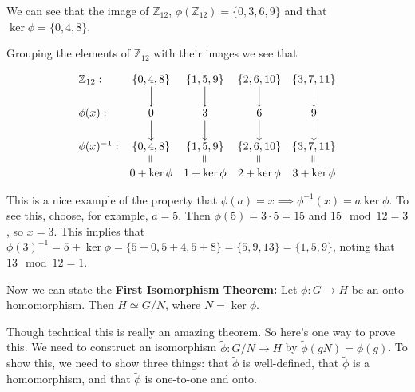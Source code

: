 \documentclass[11pt, oneside]{article}   	%
\theoremstyle{definition}
\newcommand{\veq}{\mathrel{\rotatebox{90}{$=$}}}
\DeclareMathOperator{\bda}{\Big \downarrow}
\begin{document}
\bigskip
\noindent
We can see that the image of $\mathbb{Z}_{12}$, $\phi(\mathbb{Z}_{12}) = \{0,3,6,9\}$ and that $\ker \phi = \{0,4,8\}$. 

\bigskip
\noindent
Grouping the  elements of $\mathbb{Z}_{12}$ with their images we see that

\bigskip
\begin{equation*}
\begin{array}{l c c c c}
\mathbb{Z}_{12}:  & \{0,4,8\}  & \{1,5,9\}     & \{2,6,10\}   & \{3,7,11\} \\
                             & \bda       & \bda          & \bda           & \bda  \\
\phi(x):                  & 0            & 3               & 6                & 9     \\
                             & \bda       & \bda          & \bda           & \bda  \\
\phi(x)^{-1}:          & \{0,4,8\}  & \{1,5,9\}     & \{2,6,10\}    & \{3,7,11\}  \\
                             & \veq       & \veq           & \veq           & \veq \\
                             & 0 + \ker \phi & 1+\ker \phi & 2+\ker \phi & 3+\ker \phi

\end{array}
\end{equation*}

\bigskip
\noindent
This is a nice example of the property  that $\phi(a) = x \implies \phi^{-1}(x) = a \ker \phi$. To see this, choose, for example, $a = 5$. Then 
$\phi(5) = 3\cdot 5 = 15$ and $15 \mod 12 = 3$, so $x = 3$. This implies that  
$\phi(3)^{-1} = 5 + \ker \phi = \{5+0, 5+4, 5+8\} = \{5, 9, 13\} = \{1,5,9\}$, noting that $13 \mod 12 = 1$. 

\bigskip
\noindent
Now we can state the \textbf{First Isomorphism Theorem:} Let $\phi: G \rightarrow H$ be an onto homomorphism.  Then $H \simeq G/N$, where $N = \ker \phi$.

\bigskip
\noindent
Though technical this is really an amazing theorem. So here's one way to prove this.  We need to construct  an isomorphism 
$\widetilde{\phi}: G/N \rightarrow H$ by $\widetilde{\phi}(gN) = \phi(g)$. To show this, we need to show three things:  that $\widetilde{\phi}$ is well-defined, 
that $\widetilde{\phi}$ is a homomorphism, and that $\widetilde{\phi}$ is one-to-one and onto.
\end{document}
